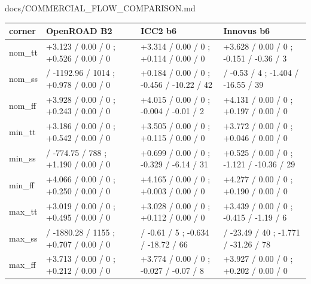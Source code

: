 \begin{relocated}{docs/COMMERCIAL_FLOW_COMPARISON.md}
{{
\begin{longtable}[]{@{}
  >{\raggedright\arraybackslash}p{}
  >{\raggedright\arraybackslash}p{}
  >{\raggedright\arraybackslash}p{}
  >{\raggedright\arraybackslash}p{}@{}}
\toprule\noalign{}
\begin{minipage}[b]{\linewidth}\raggedright
corner
\end{minipage} & \begin{minipage}[b]{\linewidth}\raggedright
OpenROAD B2
\end{minipage} & \begin{minipage}[b]{\linewidth}\raggedright
ICC2 b6
\end{minipage} & \begin{minipage}[b]{\linewidth}\raggedright
Innovus b6
\end{minipage} \\
\midrule\noalign{}
\endhead
\bottomrule\noalign{}
\endlastfoot
nom\_tt & +3.123 / 0.00 / 0 ; +0.526 / 0.00 / 0 & +3.314 / 0.00 / 0 ;
+0.114 / 0.00 / 0 & +3.628 / 0.00 / 0 ; -0.151 / -0.36 / 3 \\
nom\_ss & -3.426 / -1192.96 / 1014 ; +0.978 / 0.00 / 0 & +0.184 / 0.00 /
0 ; -0.456 / -10.22 / 42 & -0.215 / -0.53 / 4 ; -1.404 / -16.55 / 39 \\
nom\_ff & +3.928 / 0.00 / 0 ; +0.243 / 0.00 / 0 & +4.015 / 0.00 / 0 ;
-0.004 / -0.01 / 2 & +4.131 / 0.00 / 0 ; +0.197 / 0.00 / 0 \\
min\_tt & +3.186 / 0.00 / 0 ; +0.542 / 0.00 / 0 & +3.505 / 0.00 / 0 ;
+0.115 / 0.00 / 0 & +3.772 / 0.00 / 0 ; +0.046 / 0.00 / 0 \\
min\_ss & -2.777 / -774.75 / 788 ; +1.190 / 0.00 / 0 & +0.699 / 0.00 / 0
; -0.329 / -6.14 / 31 & +0.525 / 0.00 / 0 ; -1.121 / -10.36 / 29 \\
min\_ff & +4.066 / 0.00 / 0 ; +0.250 / 0.00 / 0 & +4.165 / 0.00 / 0 ;
+0.003 / 0.00 / 0 & +4.277 / 0.00 / 0 ; +0.190 / 0.00 / 0 \\
max\_tt & +3.019 / 0.00 / 0 ; +0.495 / 0.00 / 0 & +3.028 / 0.00 / 0 ;
+0.112 / 0.00 / 0 & +3.439 / 0.00 / 0 ; -0.415 / -1.19 / 6 \\
max\_ss & -4.326 / -1880.28 / 1155 ; +0.707 / 0.00 / 0 & -0.490 / -0.61
/ 5 ; -0.634 / -18.72 / 66 & -1.250 / -23.49 / 40 ; -1.771 / -31.26 /
78 \\
max\_ff & +3.713 / 0.00 / 0 ; +0.212 / 0.00 / 0 & +3.774 / 0.00 / 0 ;
-0.027 / -0.07 / 8 & +3.927 / 0.00 / 0 ; +0.202 / 0.00 / 0 \\
\end{longtable}
}

}
\end{relocated}

